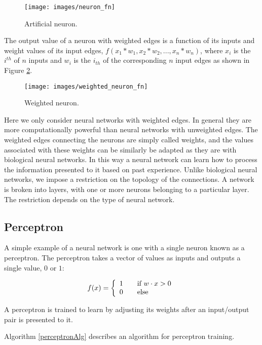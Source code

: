 \begin{figure}[htb!]
  \centering
  \texttt{[image: images/neuron\_fn]}
  \caption{Artificial neuron.}
  \label{neuron}
\end{figure}

The output value of a neuron with weighted edges is a function of its
inputs and weight values of its input edges, $f(x_1 * w_1, x_2 * w_2,
..., x_n * w_n)$, where $x_i$ is the $i^{th}$ of $n$ inputs and $w_i$
is the $i_{th}$ of the corresponding $n$ input edges as shown in
Figure \ref{weighted_neuron}.

\begin{figure}[htb!]
  \centering
  \texttt{[image: images/weighted\_neuron\_fn]}
  \caption{Weighted neuron.}
  \label{weighted_neuron}
\end{figure}

Here we only consider neural networks with weighted edges. 
In general they are more computationally powerful than neural networks with unweighted edges.
The weighted edges connecting the neurons are simply called weights, and the values associated with these weights can be similarly be adapted as they are with biological neural networks. 
In this way a neural network can learn how to process the information presented to it based on past experience. 
Unlike biological neural networks, we impose a restriction on the topology of the connections.
A network is broken into layers, with one or more neurons belonging to a particular layer.
The restriction depends on the type of neural network.

\subsection{Perceptron}
A simple example of a neural network is one with a single neuron known as a perceptron.
The perceptron takes a vector of values as inputs and outputs a single value, $0$ or $1$:

\[
  f(x) = \left\{ 
  \begin{array}{l l}
    1 & \quad \text{if $w \cdot x > 0$}\\
    0 & \quad \text{else}\\
  \end{array} \right.
\]

A perceptron is trained to learn by adjusting its weights after an
input/output pair is presented to it.

Algorithm \ref{perceptronAlg} describes an algorithm for perceptron training.

